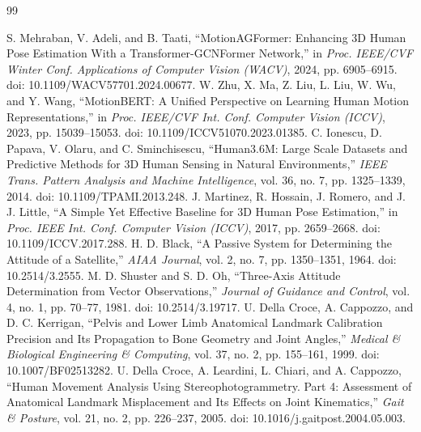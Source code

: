\documentclass[12pt,a4paper]{report}
\begin{document}
\renewcommand{\bibname}{REFERENCES}
\newpage
{}
{}
\begin{thebibliography}{99}

 S. Mehraban, V. Adeli, and B. Taati, ``MotionAGFormer: Enhancing 3D Human Pose Estimation With a Transformer-GCNFormer Network,'' in \emph{Proc. IEEE/CVF Winter Conf. Applications of Computer Vision (WACV)}, 2024, pp. 6905--6915. doi: 10.1109/WACV57701.2024.00677.
 W. Zhu, X. Ma, Z. Liu, L. Liu, W. Wu, and Y. Wang, ``MotionBERT: A Unified Perspective on Learning Human Motion Representations,'' in \emph{Proc. IEEE/CVF Int. Conf. Computer Vision (ICCV)}, 2023, pp. 15039--15053. doi: 10.1109/ICCV51070.2023.01385.
 C. Ionescu, D. Papava, V. Olaru, and C. Sminchisescu, ``Human3.6M: Large Scale Datasets and Predictive Methods for 3D Human Sensing in Natural Environments,'' \emph{IEEE Trans. Pattern Analysis and Machine Intelligence}, vol. 36, no. 7, pp. 1325--1339, 2014. doi: 10.1109/TPAMI.2013.248.
 J. Martinez, R. Hossain, J. Romero, and J. J. Little, ``A Simple Yet Effective Baseline for 3D Human Pose Estimation,'' in \emph{Proc. IEEE Int. Conf. Computer Vision (ICCV)}, 2017, pp. 2659--2668. doi: 10.1109/ICCV.2017.288.
 H. D. Black, ``A Passive System for Determining the Attitude of a Satellite,'' \emph{AIAA Journal}, vol. 2, no. 7, pp. 1350--1351, 1964. doi: 10.2514/3.2555.
 M. D. Shuster and S. D. Oh, ``Three-Axis Attitude Determination from Vector Observations,'' \emph{Journal of Guidance and Control}, vol. 4, no. 1, pp. 70--77, 1981. doi: 10.2514/3.19717.
 U. Della Croce, A. Cappozzo, and D. C. Kerrigan, ``Pelvis and Lower Limb Anatomical Landmark Calibration Precision and Its Propagation to Bone Geometry and Joint Angles,'' \emph{Medical \& Biological Engineering \& Computing}, vol. 37, no. 2, pp. 155--161, 1999. doi: 10.1007/BF02513282.
 U. Della Croce, A. Leardini, L. Chiari, and A. Cappozzo, ``Human Movement Analysis Using Stereophotogrammetry. Part 4: Assessment of Anatomical Landmark Misplacement and Its Effects on Joint Kinematics,'' \emph{Gait \& Posture}, vol. 21, no. 2, pp. 226--237, 2005. doi: 10.1016/j.gaitpost.2004.05.003.

\end{thebibliography}
\end{document}
